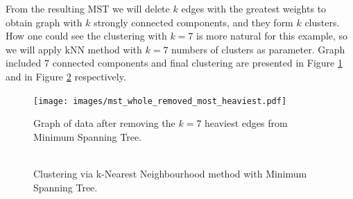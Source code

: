 {	From the resulting MST we will delete $k$ edges with the greatest weights to obtain graph with $k$ strongly connected components, and they form $k$ clusters. How one could see the clustering with $k=7$ is more natural for this example, so we will apply kNN method with $k = 7$ numbers of clusters as parameter. Graph included $7$ connected components and final clustering are presented in Figure \ref{fig:mst_whole_removed_heaviest} and in Figure \ref{fig:mst_clusters_splitted} respectively.

\begin{figure}[h]
	\centering
	\begin{minipage}[h]{0.1\linewidth}
\texttt{[image: images/mst\_whole\_removed\_most\_heaviest.pdf]}
	\end{minipage}
	\caption{Graph of data after removing the $k=7$ heaviest edges from Minimum Spanning Tree.}
	\label{fig:mst_whole_removed_heaviest}	
\end{figure}	

\begin{figure}[h]
	\centering
	\begin{minipage}[h]{0.1\linewidth}
\includegraphics[width=\linewidth]{images/mst_clusters_splitted.pdf}
	\end{minipage}
	\caption{Clustering via k-Nearest Neighbourhood method with Minimum Spanning Tree.}
	\label{fig:mst_clusters_splitted}	
\end{figure}	

}
